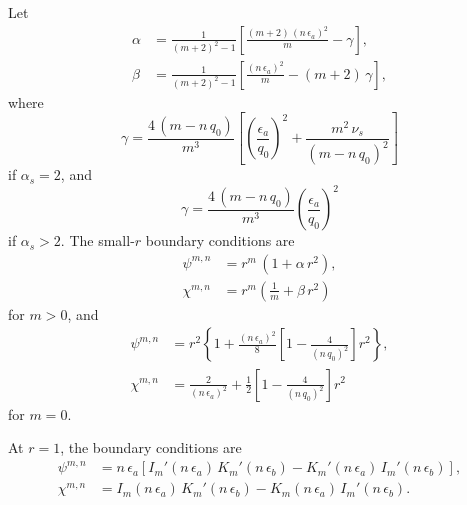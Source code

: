 \documentclass[12pt, oneside]{article}
\begin{document}
Let
\begin{align}
\alpha &= \frac{1}{(m+2)^2-1}\left[\frac{(m+2)\,(n\,\epsilon_a)^2}{m}-\gamma\right],\\[0.5ex]
\beta &= \frac{1}{(m+2)^2-1}\left[\frac{(n\,\epsilon_a)^2}{m}-(m+2)\,\gamma\right],
\end{align}
where
\begin{equation}
\gamma = \frac{4\,(m-n\,q_0)}{m^3}\left[\left(\frac{\epsilon_a}{q_0}\right)^2 + \frac{m^2\,\nu_s}{(m-n\,q_0)^2}\right]
\end{equation}
if $\alpha_s=2$, and 
\begin{equation}
\gamma = \frac{4\,(m-n\,q_0)}{m^3}\left(\frac{\epsilon_a}{q_0}\right)^2
\end{equation}
if $\alpha_s>2$. 
The small-$r$ boundary conditions are
\begin{align}
\psi^{m,n}&=r^m\,(1+\alpha\,r^2),\\[0.5ex]
\chi^{m,n}&=r^m\left(\frac{1}{m}+ \beta\,r^2\right)
\end{align}
for $m>0$, and
\begin{align}
\psi^{m,n}&=r^2\left\{1+\frac{(n\,\epsilon_a)^2}{8}\left[1-\frac{4}{(n\,q_0)^2}\right]r^2\right\},\\[0.5ex]
\chi^{m,n}&=\frac{2}{(n\,\epsilon_a)^2}+\frac{1}{2}\left[1-\frac{4}{(n\,q_0)^2}\right]r^2
\end{align}
for $m=0$. 

At $r=1$, the boundary conditions are 
\begin{align}
\psi^{m,n} &= n\,\epsilon_a\left[I_m'(n\,\epsilon_a)\,K_m'(n\,\epsilon_b)- K_m'(n\,\epsilon_a)\,I_m'(n\,\epsilon_b)\right],\\[0.5ex]
\chi^{m,n} &= I_m(n\,\epsilon_a)\,K_m'(n\,\epsilon_b)- K_m(n\,\epsilon_a)\,I_m'(n\,\epsilon_b).
\end{align}
\end{document}
